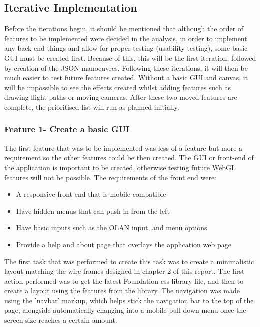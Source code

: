\subsection{Iterative Implementation}
Before the iterations begin, it should be mentioned that although the order of features to be implemented were decided in the analysis, in order to implement any back end things and allow for proper testing (usability testing), some basic GUI must be created first. Because of this, this will be the first iteration, followed by creation of the JSON manoeuvres. Following these iterations, it will then be much easier to test future features created. Without a basic GUI and canvas, it will be impossible to see the effects created whilst adding features such as drawing flight paths or moving cameras. After these two moved features are complete, the prioritised list will run as planned initially.

\subsubsection{Feature 1- Create a basic GUI}
The first feature that was to be implemented was less of a feature but more a requirement so the other features could be then created. The GUI or front-end of the application is important to be created, otherwise testing future WebGL features will not be possible. The requirements of the front end were:

\begin{itemize}
\item A responsive front-end that is mobile compatible
\item Have hidden menus that can push in from the left
\item Have basic inputs such as the OLAN input, and menu options
\item Provide a help and about page that overlays the application web page
\end{itemize}

The first task that was performed to create this task was to create a minimalistic layout matching the wire frames designed in chapter 2 of this report. The first action performed was to get the latest Foundation \cite{foundation} css library file, and then to create a layout using the features from the library. The navigation was made using the 'navbar' markup, which helps stick the navigation bar to the top of the page, alongside automatically changing into a mobile pull down menu once the screen size reaches a certain amount.


